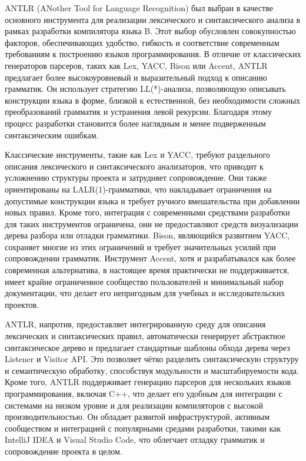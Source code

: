 ANTLR (ANother Tool for Language Recognition) был выбран в качестве основного инструмента для реализации лексического и синтаксического анализа в рамках разработки компилятора языка B. 
Этот выбор обусловлен совокупностью факторов, обеспечивающих удобство, гибкость и соответствие современным требованиям к построению языков программирования. 
В отличие от классических генераторов парсеров, таких как Lex, YACC, Bison или Accent, ANTLR предлагает более высокоуровневый и выразительный подход к описанию грамматик. 
Он использует стратегию LL(*)-анализа, позволяющую описывать конструкции языка в форме, близкой к естественной, без необходимости сложных преобразований грамматик и устранения левой рекурсии. 
Благодаря этому процесс разработки становится более наглядным и менее подверженным синтаксическим ошибкам.

Классические инструменты, такие как Lex и YACC, требуют раздельного описания лексического и синтаксического анализаторов, что приводит к усложнению структуры проекта и затрудняет сопровождение. 
Они также ориентированы на LALR(1)-грамматики, что накладывает ограничения на допустимые конструкции языка и требует ручного вмешательства при добавлении новых правил. 
Кроме того, интеграция с современными средствами разработки для таких инструментов ограничена, они не предоставляют средств визуализации дерева разбора или отладки грамматики. 
Bison, являющийся развитием YACC, сохраняет многие из этих ограничений и требует значительных усилий при сопровождении грамматик. 
Инструмент Accent, хотя и разрабатывался как более современная альтернатива, в настоящее время практически не поддерживается, имеет крайне ограниченное сообщество пользователей и минимальный набор документации, что делает его непригодным для учебных и исследовательских проектов.

ANTLR, напротив, предоставляет интегрированную среду для описания лексических и синтаксических правил, автоматически генерирует абстрактное синтаксическое дерево и предлагает стандартные шаблоны обхода дерева через Listener и Visitor API. 
Это позволяет чётко разделить синтаксическую структуру и семантическую обработку, способствуя модульности и масштабируемости кода. Кроме того, ANTLR поддерживает генерацию парсеров для нескольких языков программирования, включая C++, что делает его удобным для интеграции с системами на низком уровне и для реализации компиляторов с высокой производительностью. 
Он обладает развитой инфраструктурой, активным сообществом и интеграцией с популярными средами разработки, такими как IntelliJ IDEA и Visual Studio Code, что облегчает отладку грамматик и сопровождение проекта в целом.

